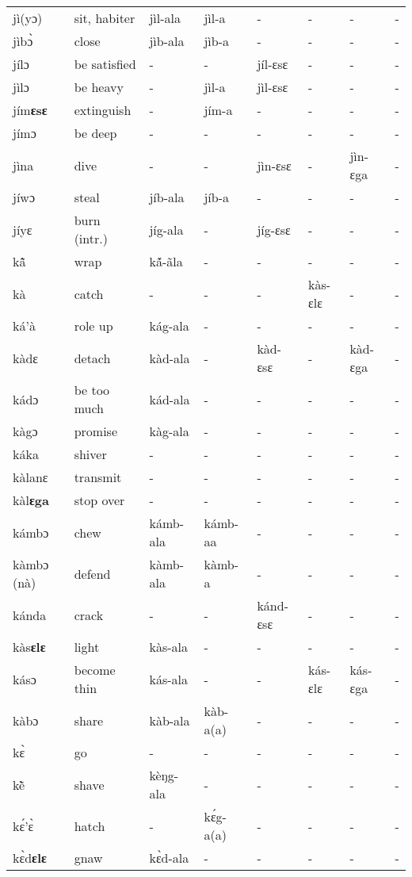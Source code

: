 \begin{sidewaystable}
\begin{longtable}{lp{3.5cm}llllll}
jì(yɔ) & sit, habiter & jìl-ala & jìl-a  & - & - & - & - \\
jìbɔ̀ & close & jìb-ala & jìb-a & - & - & - & - \\
jílɔ & be satisfied & - & - & jíl-ɛsɛ & - & - & - \\
jìlɔ & be heavy & - & jìl-a & jìl-ɛsɛ & - & - &  - \\
jím{\bfseries ɛsɛ} & extinguish & - & jím-a & - & - & - &  - \\
jímɔ & be deep & - & - & - & - &  - & -  \\
jìna & dive & - & - & jìn-ɛsɛ & - & jìn-ɛga & - \\
jíwɔ & steal & jíb-ala & jíb-a & - & - & - & - \\
jíyɛ & burn (intr.) & jíg-ala & - & jíg-ɛsɛ & - & - & - \\
kã̂ & wrap & kã́-ãla & - & - & - & - & - \\
kà & catch & - & - & - & kàs-ɛlɛ & - & - \\
ká'à & role up & kág-ala & - & - & - & - & - \\
kàdɛ & detach & kàd-ala & - & kàd-ɛsɛ & - &  kàd-ɛga & - \\
kádɔ & be too much & kád-ala & - & - & - & - & - \\
kàgɔ & promise & kàg-ala & - & - & - & - & - \\
káka & shiver & - &  - & - & - & - & - \\
kàlanɛ & transmit & - & - & - & - & - & - \\
kàl{\bfseries ɛga}  & stop over & - & - & - & - & - & - \\
kámbɔ & chew & kámb-ala & kámb-aa & - & - & - &  - \\
kàmbɔ (nà) & defend & kàmb-ala & kàmb-a & - & - & - & - \\
kánda & crack & - & - & kánd-ɛsɛ & - & - & - \\
kàs{\bfseries ɛlɛ} & light & kàs-ala & - & - & - & - & - \\
kásɔ & become thin & kás-ala & - & - &  kás-ɛlɛ & kás-ɛga & - \\
kàbɔ & share & kàb-ala & kàb-a(a) & - & - & - & - \\
kɛ̀ & go &  - & - & - & - & - & - \\
kẽ̀ & shave & kèŋg-ala & - & - & - & - & - \\
kɛ́'ɛ̀ & hatch & - & kɛ́g-a(a) & - & - & - & - \\
kɛ̀d{\bfseries ɛlɛ} & gnaw & kɛ̀d-ala & - & - & - & - & - \\

\end{longtable}
\end{sidewaystable}
